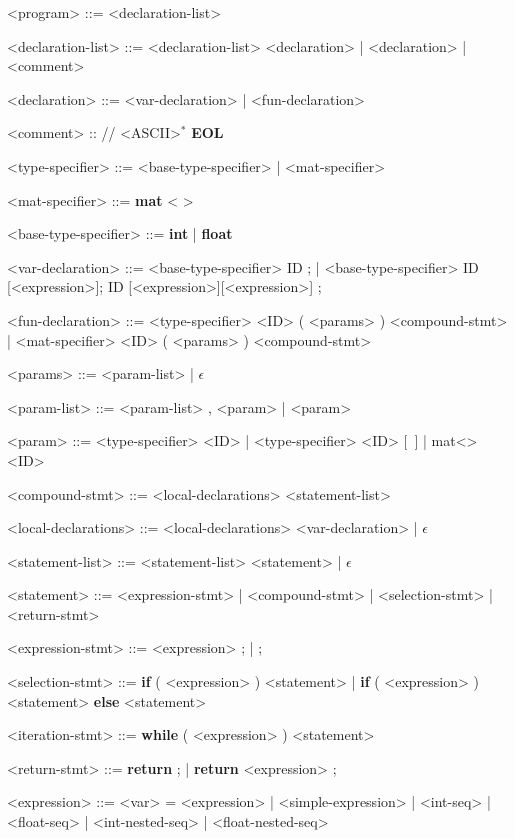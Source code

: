 \begin{grammar}	
	<program> ::= <declaration-list> 
	
	<declaration-list> ::= <declaration-list> <declaration> | <declaration> | <comment>
	
	<declaration> ::= <var-declaration> | <fun-declaration>
	
	<comment> :: // <ASCII>$^*$ \textbf{EOL}
	
	<type-specifier> ::= <base-type-specifier> | <mat-specifier>
	
	<mat-specifier> ::= \textbf{mat} \textless <base-type-specifier> \textgreater 
	
	<base-type-specifier> ::= \textbf{int} | \textbf{float}
	
	<var-declaration> ::= <base-type-specifier> ID ; | <base-type-specifier> ID [<expression>]; \alt <mat-specifier> ID [<expression>][<expression>] ;
	
	<fun-declaration> ::= <type-specifier> <ID> ( <params> ) <compound-stmt> | <mat-specifier> <ID> ( <params> ) <compound-stmt>
	
	<params> ::= <param-list> | $\epsilon$ 
	
	<param-list> ::= <param-list> , <param> | <param> 
	
	<param> ::= <type-specifier> <ID> | <type-specifier> <ID> $[$\ $]$ | mat\textless<type-specifier-base>> <ID> 
	
	<compound-stmt> ::= { <local-declarations> <statement-list> } 
	
	<local-declarations> ::= <local-declarations> <var-declaration> | $\epsilon$ 
	
	<statement-list> ::= <statement-list> <statement> | $\epsilon$
	
	<statement> ::= <expression-stmt> | <compound-stmt> | <selection-stmt> \alt <iteration-stmt> | <return-stmt> 
	
	<expression-stmt> ::= <expression> ; | ; 
	
	<selection-stmt> ::= \textbf{if} ( <expression> ) <statement> | \textbf{if} ( <expression> ) <statement> \textbf{else} <statement> 
	
	<iteration-stmt> ::= \textbf{while} ( <expression> ) <statement> 
	
	<return-stmt> ::= \textbf{return} ; | \textbf{return} <expression> ;
	
	<expression> ::= <var> = <expression> | <simple-expression> | {<int-seq>} | {<float-seq>} | {<int-nested-seq>} | {<float-nested-seq>}
	

\end{grammar}
